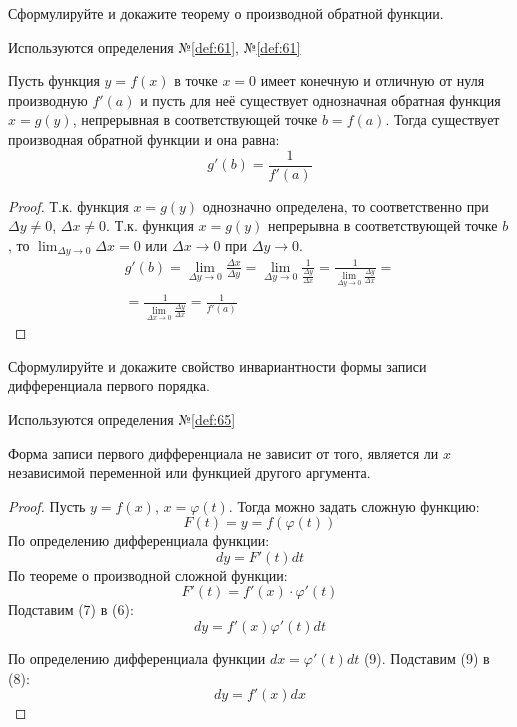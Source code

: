 \begin{question}
    Сформулируйте и докажите теорему о производной обратной функции.
\end{question}
\begin{used}
    Используются определения №\ref{def:61}, №\ref{def:61}
\end{used}
\begin{theorem}
    Пусть функция $y = f(x)$ в точке $x = 0$ имеет конечную и отличную от нуля производную  $f'(a)$ и пусть для неё существует однозначная обратная функция $x = g(y)$, непрерывная в соответствующей точке $b = f(a)$.
    Тогда существует производная обратной функции и она равна:  \[
        g'(b) = \frac{1}{f'(a)}
    \] 
\end{theorem}
\begin{proof}
    Т.к. функция $x = g(y)$ однозначно определена, то соответственно при  $\Delta y \neq 0$, $\Delta x \neq 0$.
    Т.к. функция $x = g(y)$ непрерывна в соответствующей точке $b$, то  $\lim_{\Delta y \to 0} \Delta x = 0$ или $\Delta x \to 0$ при $\Delta y \to 0$.
    \begin{gather*}
        g'(b) = \lim_{\Delta y \to 0} \frac{\Delta x}{\Delta y} = \lim_{\Delta y \to 0} \frac{1}{\frac{\Delta y}{\Delta x}} = \frac{1}{\lim_{\Delta y \to 0} \frac{\Delta y}{\Delta x}} = \\
        = \frac{1}{\lim_{\Delta x \to 0} \frac{\Delta y}{\Delta x}} = \frac{1}{f'(a)}
    \end{gather*}
\end{proof}
\pagebreak



\begin{question}
    Сформулируйте и докажите свойство инвариантности формы записи дифференциала первого порядка.
\end{question}
\begin{used}
    Используются определения №\ref{def:65}
\end{used}
\begin{theorem}
    Форма записи первого дифференциала не зависит от того, является ли $x$ независимой переменной или функцией другого аргумента.
\end{theorem}
\begin{proof}
    Пусть $y = f(x)$,  $x = \varphi(t)$. Тогда можно задать сложную функцию: \[
        F(t) = y = f(\varphi(t))
    \] 
    По определению дифференциала функции: \[
        dy = F'(t)dt \tag{6}
    \] 
    По теореме о производной сложной функции: \[
        F'(t) = f'(x) \cdot \varphi'(t) \tag{7}
    \] 
    Подставим (7) в (6): \[
        dy = f'(x) \varphi'(t) dt \tag{8} 
    \] 

    По определению дифференциала функции $dx = \varphi'(t)dt$ \quad (9).
    Подставим (9) в (8): \[
        \boxed{dy = f'(x) dx}
    \] 
\end{proof}
\pagebreak
